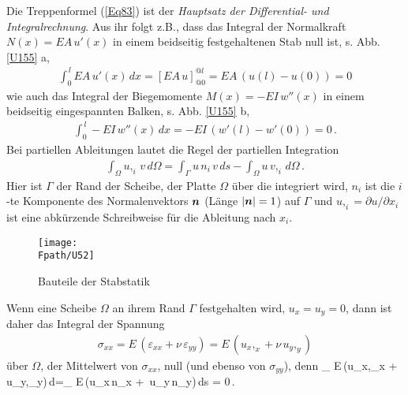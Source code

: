 {{{{Die Treppenformel (\ref{Eq83}) ist der {\em Hauptsatz der Differential- und Integralrechnung\/}. Aus ihr folgt z.B., dass das Integral der Normalkraft $N(x) = EA\,u'(x)$ in einem beidseitig festgehaltenen Stab null ist, s. Abb. \ref{U155} a,
\begin{align}\label{Eq31}
\int_0^{\,l} EA\,u'(x)\,dx = [EA\,u]_{@0}^{@l} = EA\,(u(l) - u(0)) = 0
\end{align}
wie auch das Integral der Biegemomente $M(x) = - EI\,w''(x)$ in einem beidseitig eingespannten Balken, s. Abb. \ref{U155} b,
\begin{align}\label{Eq33}
\int_0^{\,l} - EI\,w''(x)\,dx = - EI\,(w'(l) - w'(0)) = 0\,.
\end{align}
Bei partiellen Ableitungen lautet die Regel der partiellen Integration
\begin{align}
\int_{\Omega} u,_i\,v\,d\Omega = \int_{\Gamma} u\,n_i\,v\,ds - \int_{\Omega} u\,v,_i\,d\Omega\,.
\end{align}
Hier ist $\Gamma$ der Rand der Scheibe, der Platte $\Omega$ \"{u}ber die integriert wird, $n_i$ ist die $i$-te Komponente des Normalenvektors $\mbox{\boldmath $n$}$ (L\"{a}nge $|\mbox{\boldmath $n$}| = 1$) auf $\Gamma$ und $u,_i = \partial u/\partial x_i$
ist eine abk\"{u}rzende Schreibweise f\"{u}r die Ableitung nach $x_i$.
\begin{figure}[tbp]
\centering
\if {} \sidecaption \fi
\texttt{[image: \\Fpath/U52]}
\caption{Bauteile der Stabstatik} \label{U52}
%
\end{figure}%

Wenn eine Scheibe $\Omega$ an ihrem Rand $\Gamma$ festgehalten wird, $u_x = u_y = 0$, dann ist daher das Integral der Spannung
\begin{align}
\sigma_{xx} = E\,(\varepsilon_{xx} + \nu\,\varepsilon_{yy}) =  E\,(u_x,_{x} + \nu\,u_y,_{y})
\end{align}
\"{u}ber $\Omega$, der Mittelwert von $\sigma_{xx}$, null (und ebenso von $\sigma_{yy}$), denn
\beq
\int_{\Omega} E\,(u_x,_{x} + \nu\,u_y,_{y})\,d\Omega =\int_{\Gamma} E\,(u_x\,n_x + \nu\,u_y\,n_y)\,ds = 0\,.
\eeq

}}}}
